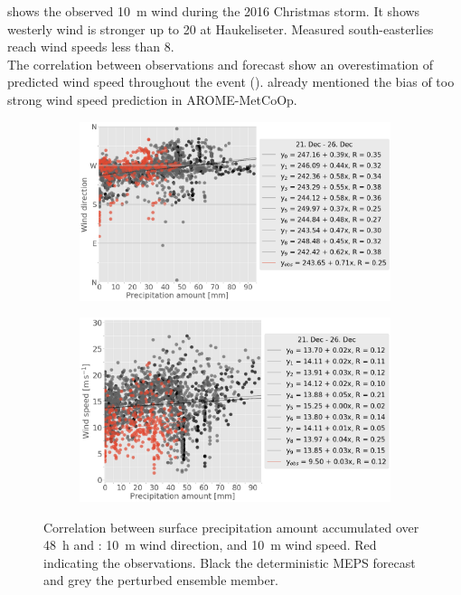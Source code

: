 \noindent
{} shows the observed \SI{10}{\metre} wind during the 2016 Christmas storm. It shows westerly wind is stronger up to \SI{20}{\mPs} at Haukeliseter. Measured south-easterlies reach wind speeds less than \SI{8}{\mPs}.
\\
The correlation between observations and forecast show an overestimation of predicted wind speed throughout the event ().%
\citet{muller_arome-metcoop:_2017} already mentioned the bias of too strong wind speed prediction in AROME-MetCoOp.%
\begin{figure}
	\centering
	\begin{subfigure}[b]{0.8\textwidth}
		\centering
		\includegraphics[width=\textwidth]{./fig_scat_PP/precip_vs_WD}
		\caption{}\label{fig:wind_precip:WD}
	\end{subfigure}
	\begin{subfigure}[b]{0.8\textwidth}
		\centering
		\includegraphics[width=\textwidth]{./fig_scat_PP/precip_vs_WS}
		\caption{}\label{fig:wind_precip:WS}
	\end{subfigure}
	\caption{Correlation between surface precipitation amount accumulated over \SI{48}{\hour} and \protect{}: \SI{10}{\meter} wind direction, and \protect{} \SI{10}{\metre} wind speed. Red indicating the observations. Black the deterministic MEPS forecast and grey the perturbed ensemble member.}\label{fig:wind_precip}
\end{figure}
